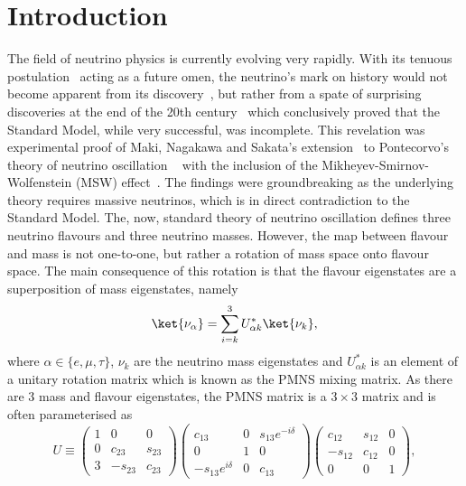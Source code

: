 \chapter{Introduction}
\label{chap:Introduction}


The field of neutrino physics is currently evolving very rapidly.  With its tenuous postulation~\cite{PauliOpenLetter} acting as a future omen, the neutrino's mark on history would not become apparent from its discovery~\cite{Cowan20071956, PhysRevLett.9.36, Kodama2001218}, but rather from a spate of surprising discoveries at the end of the 20th century~\cite{PhysRevLett.81.1562, PhysRevLett.87.071301, PhysRevLett.90.021802} which conclusively proved that the Standard Model, while very successful, was incomplete.  This revelation was experimental proof of Maki, Nagakawa and Sakata's extension~\cite{Maki01111962} to Pontecorvo's theory of neutrino oscillation ~\cite{Pontecorvo} with the inclusion of the Mikheyev-Smirnov-Wolfenstein (MSW) effect~\cite{PhysRevD.17.2369,Mikheev:1986gs}.  The findings were groundbreaking as the underlying theory requires massive neutrinos, which is in direct contradiction to the Standard Model.  The, now, standard theory of neutrino oscillation defines three neutrino flavours and three neutrino masses.  However, the map between flavour and mass is not one-to-one, but rather a rotation of mass space onto flavour space.  The main consequence of this rotation is that the flavour eigenstates are a superposition of mass eigenstates, namely
\begin{equation}
\ket{\nu_\alpha} = \sum^{3}_{i=k}U^{\ast}_{\alpha k}\ket{\nu_k},
\label{eq:NeutrinoEigenstates}
\end{equation}
where $\alpha \in \{e,\mu, \tau\}$, $\nu_k$ are the neutrino mass eigenstates and $U^{\ast}_{\alpha k}$ is an element of a unitary rotation matrix which is known as the PMNS mixing matrix.  As there are 3 mass and flavour eigenstates, the PMNS matrix is a $3\times3$ matrix and is often parameterised as 
\begin{equation}
U \equiv
\begin{pmatrix}
1 & 0 & 0 \\
0 & c_{23} & s_{23} \\
3 & -s_{23} & c_{23}
\end{pmatrix}
\begin{pmatrix}
c_{13} & 0 & s_{13}e^{-i\delta} \\
0 & 1 & 0 \\
-s_{13}e^{i\delta} & 0 & c_{13} 
\end{pmatrix}
\begin{pmatrix}
c_{12} & s_{12} & 0 \\
-s_{12} & c_{12} & 0 \\
0 & 0 & 1
\end{pmatrix}
,
\label{eq:PMNSMatrix}
\end{equation}
